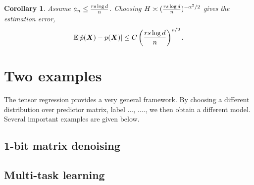 \documentclass[mathptm]{statsoc}
\newtheorem{cor}{Corollary}[section]
\begin{document}
\begin{cor} Assume $a_n \leq {rs\log d \over n}$. Choosing $H\asymp ({rs\log d \over n})^{-\alpha^2/2}$ gives the estimation error,
\[
\mathbb{E}|\hat p(\bm X)- p(\bm X)| \leq C\left({rs\log d \over n}\right)^{\rho/2}.
\]
\end{cor}

\section{Two examples}
The tensor regression provides a very general framework. By choosing a different distribution over predictor matrix, label ..., ...., we then obtain a different model. Several important examples are given below.
\subsection{1-bit matrix denoising}

\subsection{Multi-task learning}
\end{document}
